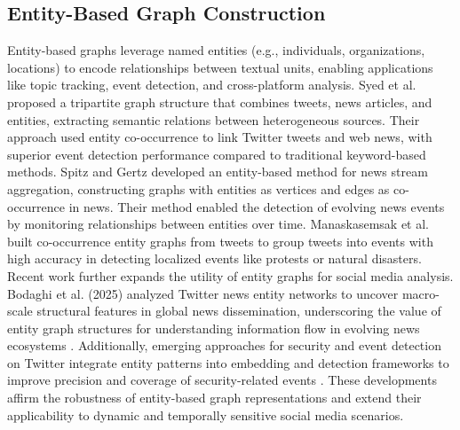\subsection{Entity-Based Graph Construction}
Entity-based graphs leverage named entities (e.g., individuals, organizations, locations) to encode relationships between textual units, enabling applications like topic tracking, event detection, and cross-platform analysis. Syed et al. \citep{syed2021unified} proposed a tripartite graph structure that combines tweets, news articles, and entities, extracting semantic relations between heterogeneous sources. Their approach used entity co-occurrence to link Twitter tweets and web news, with superior event detection performance compared to traditional keyword-based methods.
Spitz and Gertz \citep{spitz2018entity} developed an entity-based method for news stream aggregation, constructing graphs with entities as vertices and edges as co-occurrence in news. Their method enabled the detection of evolving news events by monitoring relationships between entities over time. Manaskasemsak et al. \citep{manaskasemsak2024entity} built co-occurrence entity graphs from tweets to group tweets into events with high accuracy in detecting localized events like protests or natural disasters.
Recent work further expands the utility of entity graphs for social media analysis. Bodaghi et al. (2025) analyzed Twitter news entity networks to uncover macro-scale structural features in global news dissemination, underscoring the value of entity graph structures for understanding information flow in evolving news ecosystems \citep{bodaghi2025decoding}. Additionally, emerging approaches for security and event detection on Twitter integrate entity patterns into embedding and detection frameworks to improve precision and coverage of security-related events \citep{cui2024enhancing}. These developments affirm the robustness of entity-based graph representations and extend their applicability to dynamic and temporally sensitive social media scenarios.

